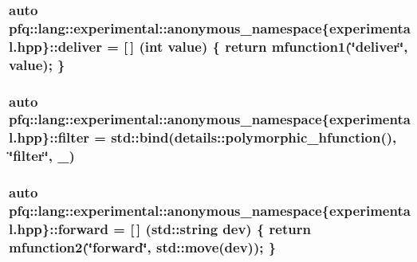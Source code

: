 \hypertarget{namespacepfq_1_1lang_1_1experimental_1_1anonymous__namespace_02experimental_8hpp_03_aabd600ebf1ee62184fa0765f49f9f990}{
\subsubsection[{deliver}]{\setlength{\rightskip}{0pt plus 5cm}auto pfq\+::lang\+::experimental\+::anonymous\+\_\+namespace\{experimental.\+hpp\}\+::deliver = \mbox{[}$\,$\mbox{]} (int value) \{ return {\bf mfunction1}(\char`\"{}deliver\char`\"{}, value); \}}}\label{namespacepfq_1_1lang_1_1experimental_1_1anonymous__namespace_02experimental_8hpp_03_aabd600ebf1ee62184fa0765f49f9f990}
\hypertarget{namespacepfq_1_1lang_1_1experimental_1_1anonymous__namespace_02experimental_8hpp_03_ae9cec76098e666e9b129804f44a93ae1}{
\subsubsection[{filter}]{\setlength{\rightskip}{0pt plus 5cm}auto pfq\+::lang\+::experimental\+::anonymous\+\_\+namespace\{experimental.\+hpp\}\+::filter = std\+::bind(details\+::polymorphic\+\_\+hfunction(), \char`\"{}filter\char`\"{}, \+\_)}}\label{namespacepfq_1_1lang_1_1experimental_1_1anonymous__namespace_02experimental_8hpp_03_ae9cec76098e666e9b129804f44a93ae1}
\hypertarget{namespacepfq_1_1lang_1_1experimental_1_1anonymous__namespace_02experimental_8hpp_03_a52cf166afea2ff74bffc6efbf839af0a}{
\subsubsection[{forward}]{\setlength{\rightskip}{0pt plus 5cm}auto pfq\+::lang\+::experimental\+::anonymous\+\_\+namespace\{experimental.\+hpp\}\+::forward = \mbox{[}$\,$\mbox{]} (std\+::string dev) \{ return {\bf mfunction2}(\char`\"{}forward\char`\"{}, std\+::move(dev)); \}}}\label{namespacepfq_1_1lang_1_1experimental_1_1anonymous__namespace_02experimental_8hpp_03_a52cf166afea2ff74bffc6efbf839af0a}
